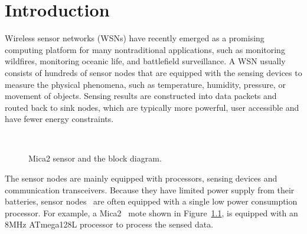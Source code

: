 \chapter{Introduction}\label{chap:intro}


Wireless sensor networks (WSNs) have recently emerged as a promising computing platform for many nontraditional 
applications, such as monitoring wildfires, monitoring oceanic life, and battlefield surveillance. A WSN usually 
consists of hundreds of sensor nodes that are equipped with the sensing devices to measure the physical phenomena, such as 
temperature, humidity, pressure, or movement of objects. Sensing results are constructed into data packets and routed 
back to sink nodes, which are typically more powerful, user accessible and have fewer energy constraints.

\begin{figure}[h]
\centering
\mbox{
}
\caption{Mica2 sensor and the block diagram.}
\label{fig:mica2}
\end{figure}

The sensor nodes are mainly equipped with processors, sensing devices and communication transceivers. Because they have 
limited power supply from their batteries, sensor nodes~\cite{mica2-power, micaz-power,telos,telosb} are often equipped with 
a single low power consumption processor. 
For example, a Mica2~\cite{mica2-power} mote shown in Figure~\ref{fig:mica2}, is equipped with an 8MHz ATmega128L 
processor to process the sensed data.

